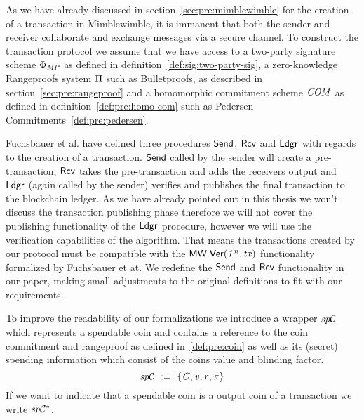 As we have already discussed in section~\ref{sec:pre:mimblewimble} for the creation of a transaction in Mimblewimble, it is immanent that both the sender and receiver collaborate and exchange messages via a secure channel.
To construct the transaction protocol we assume that we have access to a two-party signature scheme $\Phi_{\mathit{MP}}$ as defined in definition~\ref{def:sig:two-party-sig}, a zero-knowledge Rangeproofs system $\Pi$
such as Bulletproofs, as described in section~\ref{sec:pre:rangeproof} and a homomorphic commitment scheme $\mathit{COM}$ as defined in definition~\ref{def:pre:homo-com} such as Pedersen Commitments~\ref{def:pre:pedersen}.

Fuchsbauer et al. have defined three procedures $\mathsf{Send}$, $\mathsf{Rcv}$ and $\mathsf{Ldgr}$ with regards to the creation of a transaction.
$\mathsf{Send}$ called by the sender will create a pre-transaction, $\mathsf{Rcv}$ takes the pre-transaction and adds the receivers output and $\mathsf{Ldgr}$ (again called by the sender) verifies and publishes the final transaction to the blockchain ledger.
As we have already pointed out in this thesis we won't discuss the transaction publishing phase therefore we will not cover the publishing functionality of the $\mathsf{Ldgr}$ procedure, however we will use the verification capabilities of the algorithm.
That means the transactions created by our protocol must be compatible with the $\mathsf{MW.Ver(\mathit{1^n}, \mathit{tx})}$ functionality formalized by Fuchsbauer et at.
We redefine the $\mathsf{Send}$ and $\mathsf{Rcv}$ functionality in our paper, making small adjustments to the original definitions to fit with our requirements.

To improve the readability of our formalizations we introduce a wrapper $\mathit{sp}\mathcal{C}$ which represents a spendable coin and contains a reference to the coin commitment and rangeproof as defined in~\ref{def:pre:coin} as well as its (secret) spending information which consist of the coins value and blinding factor.
\[ \mathit{sp}\mathcal{C} ~:=~ \{ \mathit{C}, \mathit{v}, \mathit{r}, \pi \} \]
If we want to indicate that a spendable coin is a output coin of a transaction we write $\mathit{sp}\mathcal{C}^*$.

